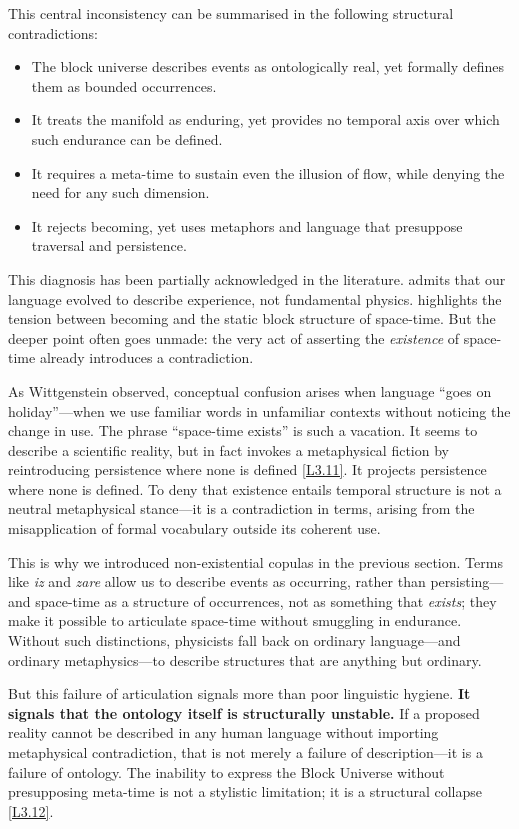 \documentclass[12pt]{book}
\newcounter{logicanchor}
\newenvironment{logicanchorenv}[1]{\refstepcounter{logicanchor}\label{#1}}{}
\newcommand{\logiclink}[2]{\begin{logicanchorenv}{logic:#1}\end{logicanchorenv}\hyperref[appendix:#1]{[#1]}\xspace}
\begin{document}
This central inconsistency can be summarised in the following structural contradictions:
\begin{itemize}
  \item The block universe describes events as ontologically real, yet formally defines them as bounded occurrences.
  \item It treats the manifold as enduring, yet provides no temporal axis over which such endurance can be defined.
  \item It requires a meta-time to sustain even the illusion of flow, while denying the need for any such dimension.
  \item It rejects becoming, yet uses metaphors and language that presuppose traversal and persistence.
\end{itemize}

This diagnosis has been partially acknowledged in the literature. \citet{Greene2004} admits that our language evolved to describe experience, not fundamental physics. \citet{Dieks2006} highlights the tension between becoming and the static block structure of space-time. But the deeper point often goes unmade: the very act of asserting the \textit{existence} of space-time already introduces a contradiction.

As Wittgenstein observed, conceptual confusion arises when language ``goes on holiday''---when we use familiar words in unfamiliar contexts without noticing the change in use. The phrase ``space-time exists'' is such a vacation. It seems to describe a scientific reality, but in fact invokes a metaphysical fiction by reintroducing persistence where none is defined \logiclink{L3.11}{}. It projects persistence where none is defined. To deny that existence entails temporal structure is not a neutral metaphysical stance---it is a contradiction in terms, arising from the misapplication of formal vocabulary outside its coherent use.

This is why we introduced non-existential copulas in the previous section. Terms like \textit{iz} and \textit{zare} allow us to describe events as occurring, rather than persisting---and space-time as a structure of occurrences, not as something that \textit{exists}; they make it possible to articulate space-time without smuggling in endurance. Without such distinctions, physicists fall back on ordinary language---and ordinary metaphysics---to describe structures that are anything but ordinary.

But this failure of articulation signals more than poor linguistic hygiene. \textbf{It signals that the ontology itself is structurally unstable.} If a proposed reality cannot be described in any human language without importing metaphysical contradiction, that is not merely a failure of description---it is a failure of ontology. The inability to express the Block Universe without presupposing meta-time is not a stylistic limitation; it is a structural collapse \logiclink{L3.12}{}.
\end{document}

